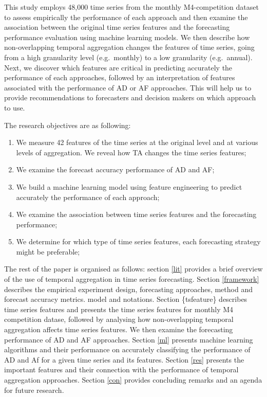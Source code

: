 \documentclass[]{elsarticle} %
\providecommand{\tightlist}{%
  \setlength{\itemsep}{0pt}\setlength{\parskip}{0pt}}
\begin{document}
This study employs 48,000 time series from the monthly M4-competition
dataset to assess empirically the performance of each approach and then
examine the association between the original time series features and
the forecasting performance evaluation using machine learning models. We
then describe how non-overlapping temporal aggregation changes the
features of time series, going from a high granularity level
(e.g.~monthly) to a low granularity (e.g.~annual). Next, we discover
which features are critical in predicting accurately the performance of
each approaches, followed by an interpretation of features associated
with the performance of AD or AF approaches. This will help us to
provide recommendations to forecasters and decision makers on which
approach to use.

The research objectives are as following:

\begin{enumerate}
\def\labelenumi{\arabic{enumi}.}
\tightlist
\item
  We measure 42 features of the time series at the original level and at
  various levels of aggregation. We reveal how TA changes the time
  series features;
\item
  We examine the forecast accuracy performance of AD and AF;
\item
  We build a machine learning model using feature engineering to predict
  accurately the performance of each approach;
\item
  We examine the association between time series features and the
  forecasting performance;
\item
  We determine for which type of time series features, each forecasting
  strategy might be preferable;
\end{enumerate}

The rest of the paper is organised as follows: section \ref{lit}
provides a brief overview of the use of temporal aggregation in time
series forecasting. Section \ref{framework} describes the empirical
experiment design, forecasting approaches, method and forecast accuracy
metrics. model and notations. Section \{tsfeature\} describes time
series features and presents the time series features for monthly M4
competition datase, followed by analysing how non-overlapping temporal
aggregation affects time series features. We then examine the
forecasting performance of AD and AF approaches. Section \ref{ml}
presents machine learning algorithms and their performance on accurately
classifying the performance of AD and Af for a given time series and its
features. Section \ref{res} presents the important features and their
connection with the performance of temporal aggregation approaches.
Section \ref{con} provides concluding remarks and an agenda for future
research.
\end{document}
